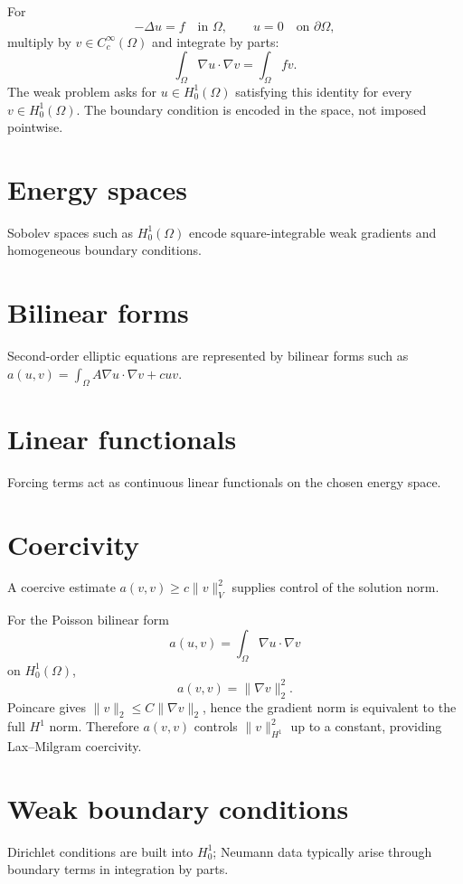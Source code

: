 \begin{example}\label{ex:iii23-expand-01}
For
\[
-\Delta u=f\quad\text{in }\Omega,\qquad u=0\quad\text{on }\partial\Omega,
\]
multiply by \(v\in C_c^\infty(\Omega)\) and integrate by parts:
\[
\int_\Omega \nabla u\cdot\nabla v
=\int_\Omega f v.
\]
The weak problem asks for \(u\in H_0^1(\Omega)\) satisfying this identity for
every \(v\in H_0^1(\Omega)\). The boundary condition is encoded in the space,
not imposed pointwise.
\end{example}
\section{Energy spaces}
Sobolev spaces such as $H_0^1(\Omega)$ encode square-integrable weak gradients and homogeneous boundary conditions.

\section{Bilinear forms}
Second-order elliptic equations are represented by bilinear forms such as $a(u,v)=\int_\Omega A\nabla u\cdot\nabla v+cuv$.

\section{Linear functionals}
Forcing terms act as continuous linear functionals on the chosen energy space.

\section{Coercivity}
A coercive estimate $a(v,v)\ge c\|v\|_V^2$ supplies control of the solution norm.


\begin{example}\label{ex:iii23-expand-02}
For the Poisson bilinear form
\[
a(u,v)=\int_\Omega\nabla u\cdot\nabla v
\]
on \(H_0^1(\Omega)\),
\[
a(v,v)=\|\nabla v\|_2^2.
\]
Poincare gives \(\|v\|_2\le C\|\nabla v\|_2\), hence the gradient norm is
equivalent to the full \(H^1\) norm. Therefore \(a(v,v)\) controls
\(\|v\|_{H^1}^2\) up to a constant, providing Lax--Milgram coercivity.
\end{example}
\section{Weak boundary conditions}
Dirichlet conditions are built into $H_0^1$; Neumann data typically arise through boundary terms in integration by parts.

